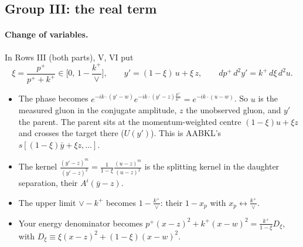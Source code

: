 \documentclass[9pt]{article}
\numberwithin{equation}{section}
\begin{document}
\subsection{Group III: the real term}
\paragraph{Change of variables.} In Rows III (both parts), V, VI put
\begin{equation}
\xi=\frac{p^+}{p^++k^+}\in\Big[0,\,1-\frac{k^+}{\vee}\Big],\qquad y'=(1-\xi)\,u+\xi\,z,\qquad dp^+\,d^2y'=k^+\,d\xi\,d^2u .
\end{equation}
\begin{itemize}
\item The phase becomes $e^{-ik\cdot(y'-w)}e^{-ik\cdot(y'-z)\frac{p^+}{k^+}}=e^{-ik\cdot(u-w)}$. So $u$ is the measured gluon in the conjugate amplitude, $z$ the unobserved gluon, and $y'$ the parent. The parent sits at the momentum-weighted centre $(1-\xi)u+\xi z$ and crosses the target there ($U(y')$). This is AABKL's $s[(1-\xi)\bar y+\xi z,\dots]$.
\item The kernel $\frac{(y'-z)^m}{(y'-z)^2}=\frac{1}{1-\xi}\frac{(u-z)^m}{(u-z)^2}$ is the splitting kernel in the daughter separation, their $A^i(\bar y-z)$.
\item The upper limit $\vee-k^+$ becomes $1-\frac{k^+}{\vee}$: their $1-x_p$ with $x_p\leftrightarrow\frac{k^+}{\vee}$.
\item Your energy denominator becomes $p^+(x-z)^2+k^+(x-w)^2=\frac{k^+}{1-\xi}D_\xi$, with $D_\xi\equiv\xi(x-z)^2+(1-\xi)(x-w)^2$.
\end{itemize}
\end{document}
